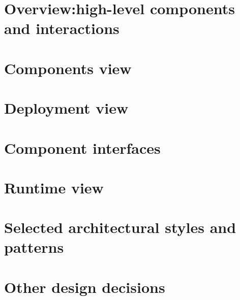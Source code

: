 \renewcommand{\thesection}{\Alph{section}}
\section{Overview:high-level components and interactions}\label{sec:overview:high-level components and interactions}
\section{Components view}\label{sec:components view}
\section{Deployment view}\label{sec:deployment view}
\section{Component interfaces}\label{sec:component interfaces}
\section{Runtime view}\label{sec:runtime view}
\section{Selected architectural styles and patterns}\label{sec:selected architectural styles and patterns}
\section{Other design decisions}\label{sec:other design decisions}